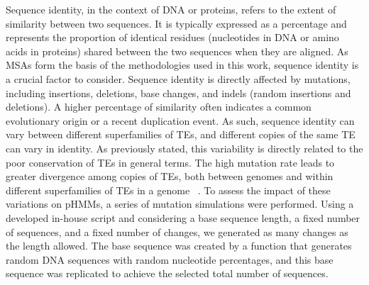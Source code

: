\documentclass[unnumsec,webpdf,contemporary,large]{oup-authoring-template}%
\theoremstyle{thmstyleone}%
\theoremstyle{thmstyletwo}%
\theoremstyle{thmstylethree}%
\begin{document}
Sequence identity, in the context of DNA or proteins, refers to the extent of
similarity between two sequences. It is typically expressed as a percentage and
represents the proportion of identical residues (nucleotides in DNA or amino
acids in proteins) shared between the two sequences when they are aligned. As
MSAs form the basis of the methodologies used in this work, sequence identity is
a crucial factor to consider. Sequence identity is directly affected by
mutations, including insertions, deletions, base changes, and indels (random
insertions and deletions). A higher percentage of similarity often indicates a
common evolutionary origin or a recent duplication event. As such, sequence
identity can vary between different superfamilies of TEs, and different copies
of the same TE can vary in identity. As previously stated, this variability is
directly related to the poor conservation of TEs in general terms. The high
mutation rate leads to greater divergence among copies of TEs, both between
genomes and within different superfamilies of TEs in a genome
~\cite{phimister_mobile_2017, bourque_ten_2018, arkhipova_giant_2019}. To assess
the impact of these variations on pHMMs, a series of mutation simulations were
performed. Using a developed in-house script and considering a base sequence
length, a fixed number of sequences, and a fixed number of changes, we generated
as many changes as the length allowed. The base sequence was created by a
function that generates random DNA sequences with random nucleotide percentages,
and this base sequence was replicated to achieve the selected total number of
sequences.
\end{document}
